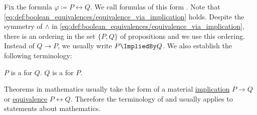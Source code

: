 \begin{definition}\label{def:equivalence}
  Fix the formula \( \varphi \coloneqq P \leftrightarrow Q \). We call formulas of this form . Note that \eqref{eq:def:boolean_equivalences/equivalence_via_implication} holds. Despite the symmetry of \( \wedge \) in \eqref{eq:def:boolean_equivalences/equivalence_via_implication}, there is an ordering in the set \( \{ P, Q \} \) of propositions and we use this ordering. Instead of \( Q \rightarrow P \), we usually write \( P \ImpliedBy Q \). We also establish the following terminology:
  \begin{DefEnum}
     \( P \) is a  for \( Q \).
     \( Q \) is a  for \( P \).
  \end{DefEnum}
\end{definition}

\begin{remark}\label{remark:statements_as_implications}
  Theorems in mathematics usually take the form of a material \hyperref[def:material_implication]{implication} \( P \rightarrow Q \) or \hyperref[def:equivalence]{equivalence} \( P \leftrightarrow Q \). Therefore the terminology of  and  usually applies to statements about mathematics.
\end{remark}

